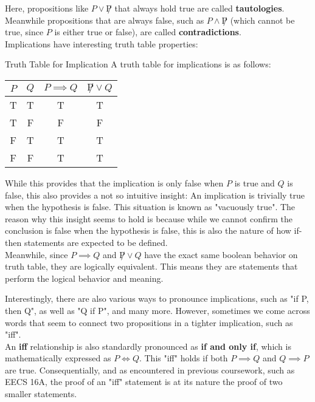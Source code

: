 Here, propositions like $P \lor \not P$ that always hold true are called \textbf{tautologies}. Meanwhile propositions that are always false, such as $P \land \not P$ (which cannot be true, since $P$ is either true or false), are called \textbf{contradictions}. \\
Implications have interesting truth table properties:
\begin{ln-fig}{Truth Table for Implication}{}
    A truth table for implications is as follows:
    \begin{center}
        \begin{tabular}{|c c||c c|}
            \hline
            $P$ & $Q$ & $P \implies Q$ & $\not P \lor Q$ \\
            \hline
            T & T & T & T \\
            \hline
            T & F & F & F\\
            \hline
            F & T & T & T\\
            \hline
            F & F & T & T \\
            \hline
        \end{tabular}
    \end{center}
    While this provides that the implication is only false when $P$ is true and $Q$ is false, this also provides a not so intuitive insight: An implication is trivially true when the hypothesis is false. This situation is known as "vacuously true". The reason why this insight seems to hold is because while we cannot confirm the conclusion is false when the hypothesis is false, this is also the nature of how if-then statements are expected to be defined. \\
    Meanwhile, since $P \implies Q$ and $\not P \lor Q$ have the exact same boolean behavior on truth table, they are logically equivalent. This means they are statements that perform the logical behavior and meaning.
\end{ln-fig}
Interestingly, there are also various ways to pronounce implications, such as "if P, then Q", as well as "Q if P", and many more. However, sometimes we come across words that seem to connect two propositions in a tighter implication, such as "iff". \\
An \textbf{iff} relationship is also standardly pronounced as \textbf{if and only if}, which is mathematically expressed as $P \iff Q$. This "iff" holds if both $P \implies Q$ and $Q \implies P$ are true. Consequentially, and as encountered in previous coursework, such as EECS 16A, the proof of an "iff" statement is at its nature the proof of two smaller statements.

